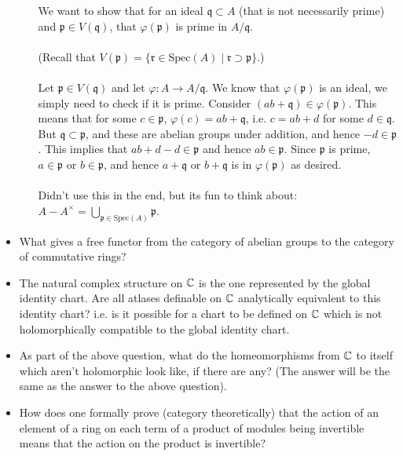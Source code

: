 \documentclass[a4paper]{amsart}
\begin{document}
\begin{itemize}
\begin{itemize}
            We want to show that for an ideal $\mathfrak{q}\subset A$ (that is not necessarily prime) and $\mathfrak{p}\in V(\mathfrak{q})$, that $\varphi(\mathfrak{p})$ is prime in $A/\mathfrak{q}$.
            \\
            \\
            (Recall that $V(\mathfrak{p})=\{\mathfrak{r}\in\text{Spec}(A)\mid \mathfrak{r}\supset \mathfrak{p}\}$.)
            \\
            \\
            Let $\mathfrak{p}\in V(\mathfrak{q})$ and let $\varphi:A\to A/\mathfrak{q}$. We know that $\varphi(\mathfrak{p})$ is an ideal, we simply need to check if it is prime. Consider $(ab+\mathfrak{q})\in \varphi(\mathfrak{p})$. This means that for some $c\in \mathfrak{p}$, $\varphi(c)=ab+\mathfrak{q}$, i.e. $c=ab+d$ for some $d\in \mathfrak{q}$. But $\mathfrak{q}\subset \mathfrak{p}$, and these are abelian groups under addition, and hence $-d\in\mathfrak{p}$. This implies that $ab+d-d\in\mathfrak{p}$ and hence $ab\in\mathfrak{p}$. Since $\mathfrak{p}$ is prime, $a\in\mathfrak{p}$ or $b\in \mathfrak{p}$, and hence $a+\mathfrak{q}$ or $b+\mathfrak{q}$ is in $\varphi(\mathfrak{p})$ as desired.
            \\
            \\
            Didn't use this in the end, but its fun to think about: $A-A^\times = \bigcup_{\mathfrak{p}\in\text{Spec}(A)} \mathfrak{p}$.
    \end{itemize}
    \item What gives a free functor from the category of abelian groups to the category of commutative rings?
    \item The natural complex structure on $\mathbb{C}$ is the one represented by the global identity chart. Are all atlases definable on $\mathbb{C}$ analytically equivalent to this identity chart? i.e. is it possible for a chart to be defined on $\mathbb{C}$ which is not holomorphically compatible to the global identity chart.
    \item As part of the above question, what do the homeomorphisms from $\mathbb{C}$ to itself which aren't holomorphic look like, if there are any? (The answer will be the same as the answer to the above question).
    \item How does one formally prove (category theoretically) that the action of an element of a ring on each term of a product of modules being invertible means that the action on the product is invertible?
\end{itemize}
\end{document}
